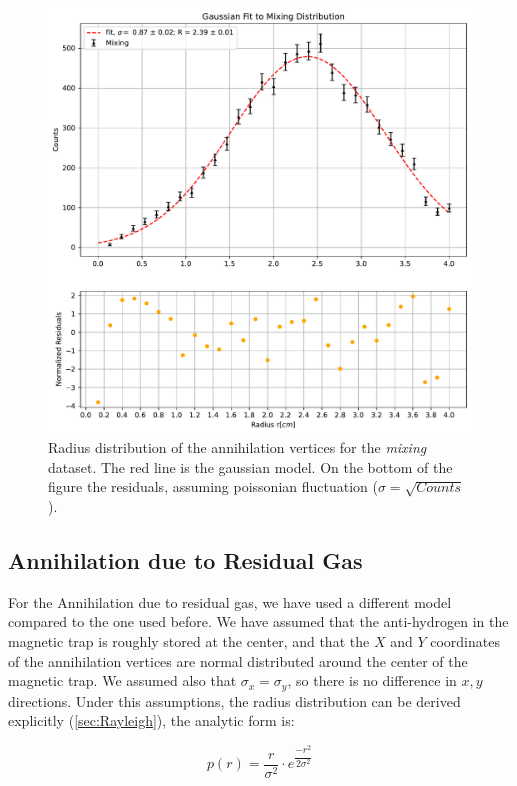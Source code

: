 \documentclass[11pt,a4paper,oneside]{article}
\begin{document}
\begin{figure}[hbtp]
\includegraphics[width = 1\textwidth]{../PlotMLEfit/SingleModel/GaussianFitMixing.pdf}
\caption{Radius distribution of the annihilation vertices for the \textit{mixing} dataset. The red line is the gaussian model. On the bottom of the figure the residuals, assuming poissonian fluctuation ($\sigma = \sqrt{Counts}$).}
\label{fig:MixingFit}
\end{figure}

\subsection*{Annihilation due to Residual Gas}

For the Annihilation due to residual gas, we have used a different model compared to the one used before. We have assumed that the anti-hydrogen in the magnetic trap is roughly stored at the center, and that the $X$ and $Y$ coordinates of the annihilation vertices are normal distributed around the center of the magnetic trap. We assumed also that $\sigma_{x} = \sigma_{y}$, so there is no difference in $x,y$ directions. Under this assumptions, the radius distribution can be derived explicitly (\ref{sec:Rayleigh}), the analytic form is:

\begin{equation}
p(r) = \frac{r}{\sigma^{2}} \cdot  e^{ \dfrac{- r^{2}}{ 2 \sigma^{2}}}
\end{equation}
\end{document}
